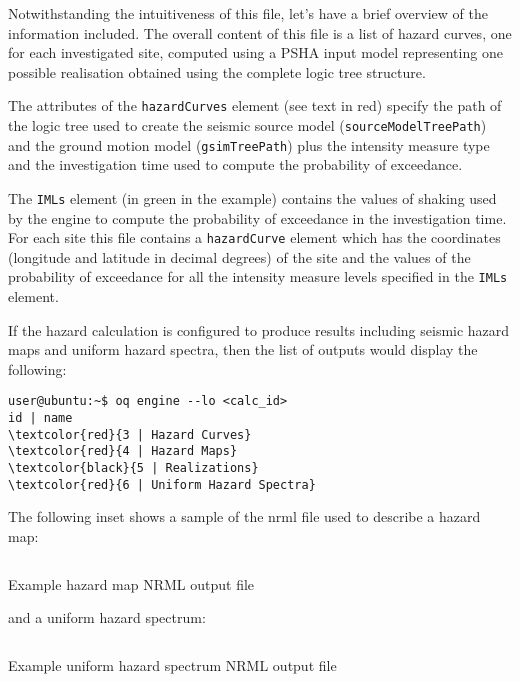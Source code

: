 Notwithstanding the intuitiveness of this file, let's have a brief overview of
the information included. The overall content of this file is a list of hazard
curves, one for each investigated site, computed using a PSHA input model
representing one possible realisation obtained using the complete logic tree
structure.

The attributes of the \texttt{hazardCurves} element (see text in red) specify
the path of the logic tree used to create the seismic source model
(\texttt{source\-Model\-TreePath}) and the ground motion model
(\texttt{gsim\-Tree\-Path}) plus the intensity measure type and the
investigation time used to compute the probability of exceedance.

The \texttt{IMLs} element (in green in the example) contains the values of
shaking used by the engine to compute the probability of exceedance in the
investigation time. For each site this file contains a \texttt{hazardCurve}
element which has the coordinates (longitude and latitude in decimal degrees)
of the site and the values of the probability of exceedance for all the
intensity measure levels specified in the \texttt{IMLs} element.

If the hazard calculation is configured to produce results including seismic
hazard maps and uniform hazard spectra, then the list of outputs would display
the following:

\begin{Verbatim}[frame=single, commandchars=\\\{\}, fontsize=\small]
user@ubuntu:~$ oq engine --lo <calc_id>
id | name
\textcolor{red}{3 | Hazard Curves}
\textcolor{red}{4 | Hazard Maps}
\textcolor{black}{5 | Realizations}
\textcolor{red}{6 | Uniform Hazard Spectra}
\end{Verbatim}

The following inset shows a sample of the nrml file used to describe a hazard
map:

\begin{listing}[htbp]
  \inputminted[firstline=1,firstnumber=1,fontsize=\footnotesize,frame=single,linenos,bgcolor=lightgray]{xml}{oqum/hazard/verbatim/output_hazard_map.xml}
  \caption{Example hazard map NRML output file}
  \label{lst:output_hazard_map_xml}
\end{listing}

\noindent and a uniform hazard spectrum:

\begin{listing}[htbp]
  \inputminted[firstline=1,firstnumber=1,fontsize=\footnotesize,frame=single,linenos,bgcolor=lightgray]{xml}{oqum/hazard/verbatim/output_uhs.xml}
  \caption{Example uniform hazard spectrum NRML output file}
  \label{lst:output_uhs}
\end{listing}
